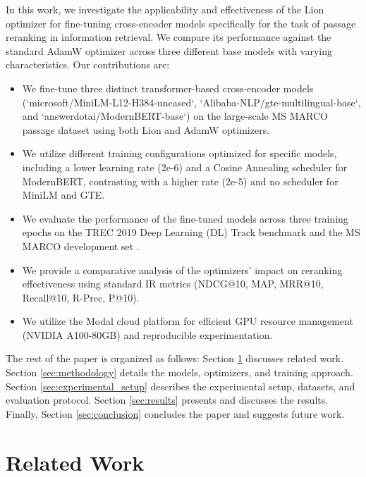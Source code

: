 \documentclass[conference]{IEEEtran}
\begin{document}
In this work, we investigate the applicability and effectiveness of the Lion optimizer for fine-tuning cross-encoder models specifically for the task of passage reranking in information retrieval. We compare its performance against the standard AdamW optimizer across three different base models with varying characteristics. Our contributions are:
\begin{itemize}
    \item We fine-tune three distinct transformer-based cross-encoder models (`microsoft/MiniLM-L12-H384-uncased`, `Alibaba-NLP/gte-multilingual-base`, and `answerdotai/ModernBERT-base`) on the large-scale MS MARCO passage dataset \cite{bajaj2016ms} using both Lion and AdamW optimizers.
    \item We utilize different training configurations optimized for specific models, including a lower learning rate (2e-6) and a Cosine Annealing scheduler for ModernBERT, contrasting with a higher rate (2e-5) and no scheduler for MiniLM and GTE.
    \item We evaluate the performance of the fine-tuned models across three training epochs on the TREC 2019 Deep Learning (DL) Track \cite{craswell2020overview} benchmark and the MS MARCO development set \cite{DBLP:journals/corr/NguyenRSGTMD16}.
    \item We provide a comparative analysis of the optimizers' impact on reranking effectiveness using standard IR metrics (NDCG@10, MAP, MRR@10, Recall@10, R-Prec, P@10).
    \item We utilize the Modal cloud platform \cite{modal_labs} for efficient GPU resource management (NVIDIA A100-80GB) and reproducible experimentation.
\end{itemize}
The rest of the paper is organized as follows: Section \ref{sec:related_work} discusses related work. Section \ref{sec:methodology} details the models, optimizers, and training approach. Section \ref{sec:experimental_setup} describes the experimental setup, datasets, and evaluation protocol. Section \ref{sec:results} presents and discusses the results. Finally, Section \ref{sec:conclusion} concludes the paper and suggests future work.

\section{Related Work}
\label{sec:related_work}
\end{document}
